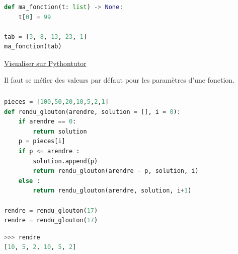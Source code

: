 \documentclass[svgnames,11pt]{beamer}
\begin{document}
\begin{frame}[fragile]
    \frametitle{}


\begin{center}
\begin{lstlisting}[language=Python, basicstyle=\ttfamily\small , xleftmargin=1em, xrightmargin=1em]
def ma_fonction(t: list) -> None:
    t[0] = 99

tab = [3, 8, 13, 23, 1]
ma_fonction(tab)
\end{lstlisting}
\end{center} 
\begin{center}
    {\LARGE \href{https://tinyurl.com/tabfonc}{Visualiser sur Pythontutor}}
\end{center}
\end{frame}
\begin{frame}
\begin{aretenir}[Observation]
Il faut se méfier des valeurs par défaut pour les paramètres d'une fonction.
\end{aretenir}
\end{frame}
\begin{frame}[fragile]
    \frametitle{}

\begin{center}
\begin{lstlisting}[language=Python, basicstyle=\ttfamily\small , xleftmargin=0.2em, xrightmargin=-1em]
pieces = [100,50,20,10,5,2,1]
def rendu_glouton(arendre, solution = [], i = 0):
    if arendre == 0:
        return solution
    p = pieces[i]
    if p <= arendre :
        solution.append(p)
        return rendu_glouton(arendre - p, solution, i)
    else :
        return rendu_glouton(arendre, solution, i+1)

rendre = rendu_glouton(17)
rendre = rendu_glouton(17)
\end{lstlisting}
\begin{lstlisting}[language=Python, basicstyle=\ttfamily\small , xleftmargin=0.2em, xrightmargin=-1em]
>>> rendre
[10, 5, 2, 10, 5, 2]
\end{lstlisting}
\end{center}

\end{frame}
\end{document}
